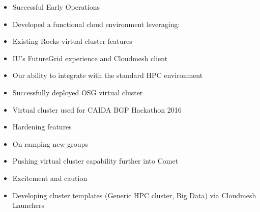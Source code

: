 \begin{itemize}
\item Successful Early Operations
\item Developed a functional cloud environment leveraging:
\item Existing Rocks virtual cluster features
\item IU's FutureGrid experience and Cloudmesh client
\item Our ability to integrate with the standard HPC environment
\item Successfully deployed OSG virtual cluster
\item Virtual cluster used for CAIDA BGP Hackathon 2016
\item Hardening features
\item On ramping new groups
\item Pushing virtual cluster capability further into Comet
\item Excitement and caution
\item Developing cluster templates (Generic HPC cluster, Big Data) via Cloudmesh Launchers
\end{itemize}

